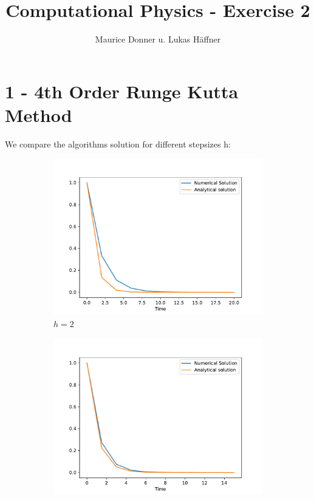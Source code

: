 \documentclass{article}
\title{Computational Physics - Exercise 2}
\author{Maurice Donner u. Lukas Häffner}
\begin{document}
\maketitle
\newpage

\section*{1 - 4th Order Runge Kutta Method}

We compare the algorithms solution for different stepsizes h:

\begin{figure}[ht]
    \centering
    \begin{subfigure}{.32\textwidth}
	\includegraphics[width=\textwidth]{1_h_eq_2.pdf} 
	\caption{$h = 2$} 	
    \end{subfigure}
    \begin{subfigure}{.32\textwidth}
	\includegraphics[width=\textwidth]{1_h_eq_1p5.pdf} 

\end{subfigure}
\end{figure}
\end{document}
